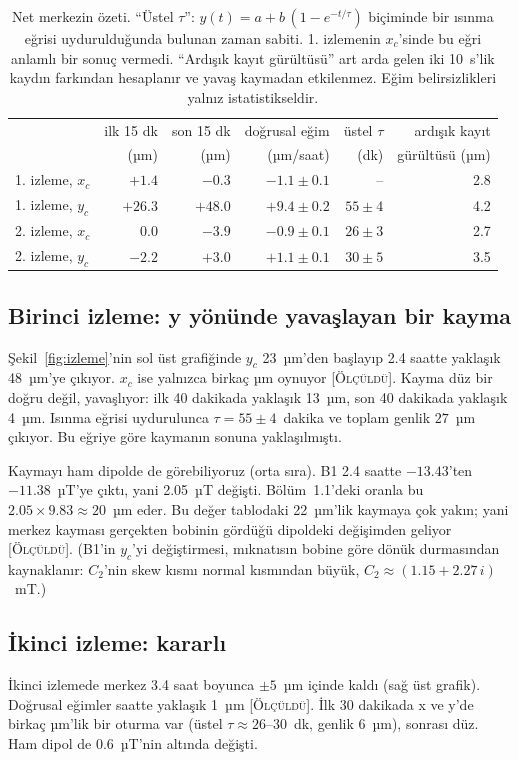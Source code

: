 \documentclass[11pt,a4paper]{article}
\newcommand{\olc}{\textsc{[Ölçüldü]}}
\begin{document}
\begin{table}[h]
\centering\small
\begin{tabular}{lrrrrr}
\toprule
 & ilk 15 dk & son 15 dk & doğrusal eğim & üstel $\tau$ & ardışık kayıt \\
 & (µm) & (µm) & (µm/saat) & (dk) & gürültüsü (µm) \\
\midrule
1. izleme, $x_c$ & $+1.4$ & $-0.3$ & $-1.1 \pm 0.1$ & -- & 2.8 \\
1. izleme, $y_c$ & $+26.3$ & $+48.0$ & $+9.4 \pm 0.2$ & $55 \pm 4$ & 4.2 \\
2. izleme, $x_c$ & $0.0$ & $-3.9$ & $-0.9 \pm 0.1$ & $26 \pm 3$ & 2.7 \\
2. izleme, $y_c$ & $-2.2$ & $+3.0$ & $+1.1 \pm 0.1$ & $30 \pm 5$ & 3.5 \\
\bottomrule
\end{tabular}
\caption{Net merkezin özeti. ``Üstel $\tau$'': $y(t) = a + b\,(1 - e^{-t/\tau})$ biçiminde bir ısınma eğrisi
uydurulduğunda bulunan zaman sabiti. 1. izlemenin $x_c$'sinde bu eğri anlamlı bir sonuç vermedi.
``Ardışık kayıt gürültüsü'' art arda gelen iki 10~s'lik kaydın farkından hesaplanır ve yavaş kaymadan
etkilenmez. Eğim belirsizlikleri yalnız istatistikseldir.}
\label{tab:merkez}
\end{table}

\subsection{Birinci izleme: y yönünde yavaşlayan bir kayma}
Şekil~\ref{fig:izleme}'nin sol üst grafiğinde $y_c$ 23~µm'den başlayıp 2.4 saatte yaklaşık 48~µm'ye
çıkıyor. $x_c$ ise yalnızca birkaç µm oynuyor \olc. Kayma düz bir doğru değil, yavaşlıyor: ilk 40 dakikada
yaklaşık 13~µm, son 40 dakikada yaklaşık 4~µm. Isınma eğrisi uydurulunca $\tau = 55 \pm 4$~dakika ve
toplam genlik $27$~µm çıkıyor. Bu eğriye göre kaymanın sonuna yaklaşılmıştı.

Kaymayı ham dipolde de görebiliyoruz (orta sıra). B1 2.4 saatte $-13.43$'ten $-11.38$~µT'ye çıktı, yani
2.05~µT değişti. Bölüm~1.1'deki oranla bu $2.05 \times 9.83 \approx 20$~µm eder. Bu değer tablodaki
22~µm'lik kaymaya çok yakın; yani merkez kayması gerçekten bobinin gördüğü dipoldeki değişimden geliyor
\olc. (B1'in $y_c$'yi değiştirmesi, mıknatısın bobine göre dönük durmasından kaynaklanır: $C_2$'nin skew
kısmı normal kısmından büyük, $C_2 \approx (1.15 + 2.27\,i)$~mT.)

\subsection{İkinci izleme: kararlı}
İkinci izlemede merkez 3.4 saat boyunca $\pm 5$~µm içinde kaldı (sağ üst grafik). Doğrusal eğimler saatte
yaklaşık 1~µm \olc. İlk 30 dakikada x ve y'de birkaç µm'lik bir oturma var (üstel $\tau \approx
26$--$30$~dk, genlik 6~µm), sonrası düz. Ham dipol de 0.6~µT'nin altında değişti.
\end{document}
